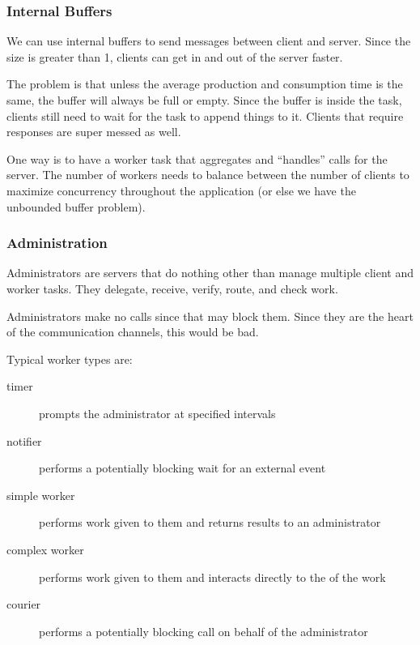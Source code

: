                 \subsubsection{Internal Buffers} %
                \label{ssub:internal_buffers}
                    We can use internal buffers to send messages between client and server.
                    Since the size is greater than 1, clients can get in and out of the server faster.

                    The problem is that unless the average production and consumption time is the same, the buffer will always be full or empty.
                    Since the buffer is inside the task, clients still need to wait for the task to append things to it.
                    Clients that require responses are super messed as well.

                    One way is to have a worker task that aggregates and ``handles'' calls for the server.
                    The number of workers needs to balance between the number of clients to maximize concurrency throughout the application (or else we have the unbounded buffer problem).
                \subsubsection{Administration} %
                \label{ssub:administration}
                    Administrators are servers that do nothing other than manage multiple client and worker tasks.
                    They delegate, receive, verify, route, and check work.

                    Administrators make no calls since that may block them.
                    Since they are the heart of the communication channels, this would be bad.

                    Typical worker types are:
                    \begin{description}
                        \item[timer] prompts the administrator at specified intervals
                        \item[notifier] performs a potentially blocking wait for an external event
                        \item[simple worker] performs work given to them and returns results to an administrator
                        \item[complex worker] performs work given to them and interacts directly to the of the work
                        \item[courier] performs a potentially blocking call on behalf of the administrator
                    \end{description}

